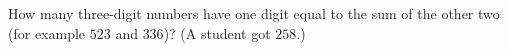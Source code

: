 How many three-digit numbers have one digit equal to the sum of the other two (for example $523$ and $336$)? (A student got $258$.)
